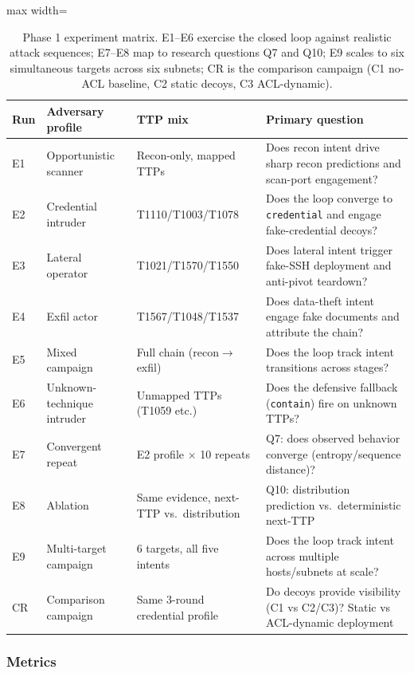 \documentclass[preprints,article,accept,oneauthor]{Definitions/mdpi}
\newcommand{\act}[1]{\texttt{#1}}
\begin{document}
\begin{table}[ht]
\centering
\begin{adjustbox}{max width=\linewidth}\begin{tabular}{@{}llll@{}}
\toprule
\textbf{Run} & \textbf{Adversary profile} & \textbf{TTP mix} & \textbf{Primary question} \\
\midrule
E1 & Opportunistic scanner & Recon-only, mapped TTPs & Does recon intent drive sharp recon predictions and scan-port engagement? \\
E2 & Credential intruder & T1110/T1003/T1078 & Does the loop converge to \act{credential} and engage fake-credential decoys? \\
E3 & Lateral operator & T1021/T1570/T1550 & Does lateral intent trigger fake-SSH deployment and anti-pivot teardown? \\
E4 & Exfil actor & T1567/T1048/T1537 & Does data-theft intent engage fake documents and attribute the chain? \\
E5 & Mixed campaign & Full chain (recon$\to$exfil) & Does the loop track intent transitions across stages? \\
E6 & Unknown-technique intruder & Unmapped TTPs (T1059 etc.) & Does the defensive fallback (\act{contain}) fire on unknown TTPs? \\
E7 & Convergent repeat & E2 profile $\times$ 10 repeats & Q7: does observed behavior converge (entropy/sequence distance)? \\
E8 & Ablation & Same evidence, next-TTP vs.\ distribution & Q10: distribution prediction vs.\ deterministic next-TTP \\
E9 & Multi-target campaign & 6 targets, all five intents & Does the loop track intent across multiple hosts/subnets at scale? \\
CR & Comparison campaign & Same 3-round credential profile & Do decoys provide visibility (C1 vs C2/C3)? Static vs ACL-dynamic deployment \\
\bottomrule
\end{tabular}\end{adjustbox}
\caption{Phase 1 experiment matrix. E1--E6 exercise the closed loop against
realistic attack sequences; E7--E8 map to research questions Q7 and Q10; E9
scales to six simultaneous targets across six subnets; CR is the comparison
campaign (C1 no-ACL baseline, C2 static decoys, C3 ACL-dynamic).}
\label{tab:experiments}
\end{table}

\subsubsection{Metrics}
\end{document}
